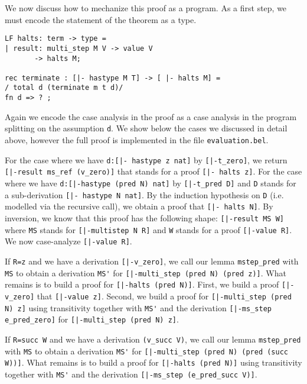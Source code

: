 We now discuss how to mechanize this proof as a program. As a first step, we
must encode the statement of the theorem as a type.

\begin{lstlisting}
LF halts: term -> type =
| result: multi_step M V -> value V
       -> halts M;

rec terminate : [|- hastype M T] -> [ |- halts M] =
/ total d (terminate m t d)/
fn d => ? ;
\end{lstlisting}

Again we encode the case analysis in the proof as a case analysis in the program
splitting on the assumption \lstinline!d!. We show below the cases we discussed
in detail above, however the full proof is implemented in the file
\lstinline!evaluation.bel!.

For the case where we have \lstinline!d:[|- hastype z nat]! by
\lstinline![|-t_zero]!, we return \lstinline![|-result ms_ref (v_zero)]! that
stands for a proof \lstinline![|- halts z]!. For the case where we have
\lstinline!d:[|-hastype (pred N) nat]! by \lstinline![|-t_pred D]! and
\lstinline!D! stands for a sub-derivation \lstinline![|- hastype N nat]!. By the
induction hypothesis on \lstinline!D! (i.e. modelled via the recursive call), we
obtain a proof that \lstinline![|- halts N]!.  By inversion, we know that this
proof has the following shape: \lstinline![|-result MS W]! where \lstinline!MS!
stands for \lstinline![|-multistep N R]! and \lstinline!W!
stands for a proof \lstinline![|-value R]!. We now case-analyze
\mbox{\lstinline![|-value R]!}.

If \lstinline!R=z! and we have a derivation
\lstinline![|-v_zero]!, we call our lemma \lstinline!mstep_pred! with
\lstinline!MS! to obtain a derivation \lstinline!MS'! for
\lstinline![|-multi_step (pred N) (pred z)]!. What remains is to build a proof
for \lstinline![|-halts (pred N)]!. First, we build a proof \lstinline![|-v_zero]!
that \lstinline![|-value z]!. Second, we build a proof for
\lstinline![|-multi_step (pred N) z]! using transitivity together with
\lstinline!MS'! and the derivation \lstinline![|-ms_step e_pred_zero]! for
\mbox{\lstinline![|-multi_step (pred N) z]!}.

If \lstinline!R=succ W! and we have a derivation
\lstinline!(v_succ V)!, we call our lemma \lstinline!mstep_pred! with
\lstinline!MS! to obtain a derivation \lstinline!MS'! for
\lstinline![|-multi_step (pred N) (pred (succ W))]!. What remains is to build a proof
for \lstinline![|-halts (pred N)]! using transitivity together with
\lstinline!MS'! and the derivation
\lstinline![|-ms_step (e_pred_succ V)]!.

